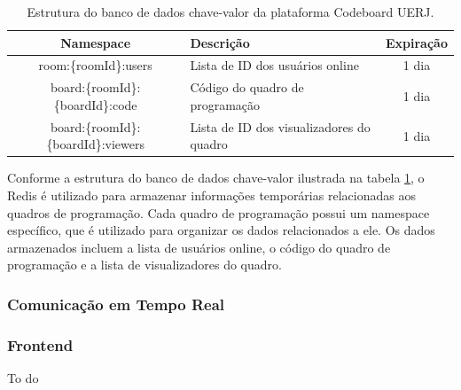 \begin{table}[H]
    \centering
    \begin{tabular}{|c|p{6cm}|c|}
        \hline
        \textbf{Namespace}                   & \textbf{Descrição}                       & \textbf{Expiração} \\
        \hline
        room:\{roomId\}:users                & Lista de ID dos usuários online          & 1 dia              \\
        \hline
        board:\{roomId\}:\{boardId\}:code    & Código do quadro de programação          & 1 dia              \\
        \hline
        board:\{roomId\}:\{boardId\}:viewers & Lista de ID dos visualizadores do quadro & 1 dia              \\ 
        
        \hline
    \end{tabular}
    \caption{Estrutura do banco de dados chave-valor da plataforma Codeboard UERJ.}
    \label{tab:key-value-database}
\end{table}

Conforme a estrutura do banco de dados chave-valor ilustrada na tabela \ref{tab:key-value-database}, o Redis é utilizado para armazenar informações temporárias relacionadas aos quadros de programação. Cada quadro de programação possui um namespace específico, que é utilizado para organizar os dados relacionados a ele. Os dados armazenados incluem a lista de usuários online, o código do quadro de programação e a lista de visualizadores do quadro.

\subsubsection{Comunicação em Tempo Real}


\subsubsection{Frontend}

To do
